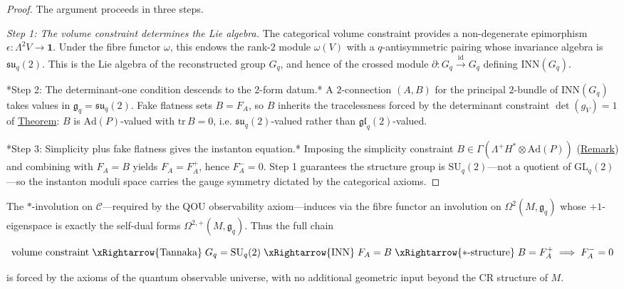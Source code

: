 \begin{proof}
The argument proceeds in three steps.

\emph{Step 1: The volume constraint determines the Lie algebra.}
The categorical volume constraint provides a non-degenerate epimorphism
$\epsilon \colon \Lambda^2 V \to \mathbf{1}$. Under the fibre functor
$\omega$, this endows the rank-$2$ module $\omega(V)$ with a
$q$-antisymmetric pairing whose invariance algebra is
$\mathfrak{su}_q(2)$. This is the Lie algebra of the reconstructed
group $G_q$, and hence of the crossed module
$\partial \colon G_q \xrightarrow{\mathrm{id}} G_q$ defining
$\mathrm{INN}(G_q)$.

*Step 2: The determinant-one condition descends to the
2-form datum.*
A $2$-connection $(A, B)$ for the principal $2$-bundle of
$\mathrm{INN}(G_q)$ takes values in
$\mathfrak{g}_q = \mathfrak{su}_q(2)$. Fake
flatness sets $B = F_A$, so $B$ inherits the
tracelessness forced by the determinant constraint
$\det(g_V) = 1$ of \hyperref[thm:su2-emergence]{Theorem}: $B$ is
$\mathrm{Ad}(P)$-valued with $\mathrm{tr}\,B = 0$, i.e.
$\mathfrak{su}_q(2)$-valued rather than $\mathfrak{gl}_q(2)$-valued.

*Step 3: Simplicity plus fake flatness gives the instanton
equation.*
Imposing the simplicity constraint
$B \in \Gamma(\Lambda^+\!H^* \otimes \mathrm{Ad}(P))$
(\hyperref[rem:self-dual-2group]{Remark}) and combining with $F_A = B$
yields $F_A = F_A^+$, hence $F_A^- = 0$. Step 1 guarantees the
structure group is $\mathrm{SU}_q(2)$---not a quotient of
$\mathrm{GL}_q(2)$---so the instanton moduli space carries the
gauge symmetry dictated by the categorical axioms.
\end{proof}

\begin{remark}
  \label{rem:simplicity-from-category}
The $*$-involution on $\mathcal{C}$---required by the QOU
observability axiom---induces via the fibre functor an involution on
$\Omega^2(M, \mathfrak{g}_q)$ whose $+1$-eigenspace is exactly the
self-dual forms $\Omega^{2,+}(M, \mathfrak{g}_q)$. Thus the full
chain

\[
\text{volume constraint}
  \;\xRightarrow{\text{Tannaka}}\;
  G_q = \mathrm{SU}_q(2)
  \;\xRightarrow{\mathrm{INN}}\;
  F_A = B
  \;\xRightarrow{*\text{-structure}}\;
  B = F_A^+
  \;\Longrightarrow\;
  F_A^- = 0
\]

is forced by the axioms of the quantum observable universe, with no
additional geometric input beyond the CR structure of $M$.
\end{remark}

